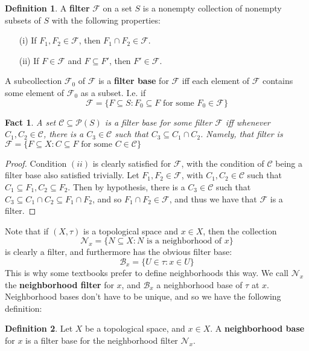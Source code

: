 \documentclass{article}
\theoremstyle{definition}
\newtheorem{definition}{Definition}[section]
\theoremstyle{plain}
\theoremstyle{theorem}
\newtheorem{fact}{Fact}[section]
\begin{document}
	\begin{definition}
		A \textbf{filter} $\mathcal{F}$ on a set $S$ is a nonempty collection of nonempty subsets of $S$ with the following properties:
		\begin{itemize}
			\item[(i)] If $F_1,F_2 \in \mathcal{F}$, then $F_1 \cap F_2 \in \mathcal{F}$. 
			\item[(ii)] If $F \in \mathcal{F}$ and $F \subseteq F'$, then $F' \in \mathcal{F}$.
		\end{itemize}
		A subcollection $\mathcal{F}_0$ of $\mathcal{F}$ is a \textbf{filter base} for $\mathcal{F}$ iff each element of $\mathcal{F}$ contains some element of $\mathcal{F}_0$ as a subset. I.e. if
		\[ \mathcal{F} = \{F \subseteq S: F_0 \subseteq F \textrm{ for some }F_0 \in \mathcal{F}\} \]
	\end{definition}
	\begin{fact}
	A set $\mathcal{C} \subseteq \mathcal{P}(S)$ is a filter base for \textit{some} filter $\mathcal{F}$ iff whenever $C_1,C_2 \in \mathcal{C}$, there is a $C_3 \in \mathcal{C}$ such that $C_3 \subseteq C_1 \cap C_2$. Namely, that filter is $\mathcal{F} = \{F \subseteq X: C \subseteq F \textrm{ for some }C \in \mathcal{C} \}$
	\end{fact}
	\begin{proof}
		Condition $(ii)$ is clearly satisfied for $\mathcal{F}$, with the condition of $\mathcal{C}$ being a filter base also satisfied trivially. Let $F_1,F_2 \in \mathcal{F}$, with $C_1,C_2 \in \mathcal{C}$ such that $C_1 \subseteq F_1, C_2 \subseteq F_2$. Then by hypothesis, there is a $C_3 \in \mathcal{C}$ such that $C_3 \subseteq C_1 \cap C_2 \subseteq F_1 \cap F_2$, and so $F_1 \cap F_2 \in \mathcal{F}$, and thus we have that $\mathcal{F}$ is a filter.
	\end{proof}
	Note that if $(X,\tau)$ is a topological space and $x \in X$, then the collection 
	\[\mathcal{N}_x = \{N \subseteq X: N \textrm{ is a neighborhood of }x\} \]
	is clearly a filter, and furthermore has the obvious filter base:
	\[ \mathcal{B}_x = \{U \in \tau: x \in U \} \]
	This is why some textbooks prefer to define neighborhoods this way. We call $\mathcal{N}_x$ the \textbf{neighborhood filter} for $x$, and $\mathcal{B}_x$ a neighborhood base of $\tau$ at $x$. Neighborhood bases don't have to be unique, and so we have the following definition:
	\begin{definition}
		Let $X$ be a topological space, and $x \in X$. A \textbf{neighborhood base} for $x$ is a filter base for the neighborhood filter $\mathcal{N}_x$.
	\end{definition}
\end{document}
